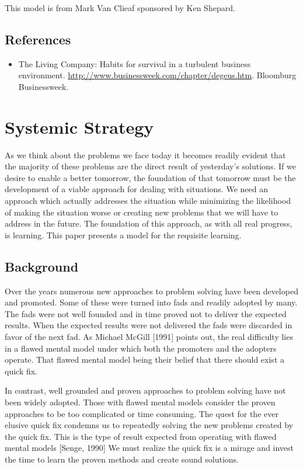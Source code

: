 \documentclass[]{memoir}
\begin{document}
This model is from Mark Van Clieaf sponsored by Ken Shepard.

\subsection{References}

\begin{itemize}
\itemsep1pt\parskip0pt
\item
  The Living Company: Habits for survival in a turbulent business
  environment. \url{http://www.businessweek.com/chapter/degeus.htm}.
  Bloomburg Businessweek.
\end{itemize}

\section{Systemic Strategy}

As we think about the problems we face today it becomes readily evident
that the majority of these problems are the direct result of yesterday's
solutions. If we desire to enable a better tomorrow, the foundation of
that tomorrow must be the development of a viable approach for dealing
with situations. We need an approach which actually addresses the
situation while minimizing the likelihood of making the situation worse
or creating new problems that we will have to address in the future. The
foundation of this approach, as with all real progress, is learning.
This paper presents a model for the requisite learning.

\subsection{Background}

Over the years numerous new approaches to problem solving have been
developed and promoted. Some of these were turned into fads and readily
adopted by many. The fads were not well founded and in time proved not
to deliver the expected results. When the expected results were not
delivered the fads were discarded in favor of the next fad. As Michael
McGill {[}1991{]} points out, the real difficulty lies in a flawed
mental model under which both the promoters and the adopters operate.
That flawed mental model being their belief that there should exist a
quick fix.

In contrast, well grounded and proven approaches to problem solving have
not been widely adopted. Those with flawed mental models consider the
proven approaches to be too complicated or time consuming. The quest for
the ever elusive quick fix condemns us to repeatedly solving the new
problems created by the quick fix. This is the type of result expected
from operating with flawed mental models {[}Senge, 1990{]} We must
realize the quick fix is a mirage and invest the time to learn the
proven methods and create sound solutions.
\end{document}
